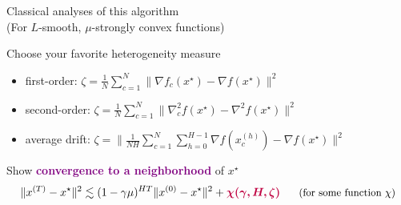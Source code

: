 \documentclass[aspectratio=169,12pt]{beamer}
\begin{document}
\begin{frame}{Classical analyses of this algorithm\\[-0.5em]
    \small (For $L$-smooth, $\mu$-strongly convex functions)}

  Choose your favorite heterogeneity measure
  \pause
  \begin{itemize}
  \item first-order: $\zeta = \frac{1}{N} \sum_{c=1}^N \big\| \nabla f_c(x^{\star}) - \nabla f(x^{\star}) \big\|^2$
  
  \pause
  
  \item second-order: $\zeta = \frac{1}{N} \sum_{c=1}^N \big\| \nabla_c^2 f(x^{\star}) - \nabla^2 f(x^{\star}) \big\|^2$
  
  \pause
  
  \item average drift: $\zeta = \big\| \frac{1}{NH} \sum_{c=1}^N \sum_{h=0}^{H-1} \nabla f(x_c^{(h)}) - \nabla f(x^{\star}) \big\|^2$
  \end{itemize}


  \pause

  Show \textcolor{purple}{\bfseries convergence to a neighborhood} of $x^\star$
  \begin{align*}
    \| x^{(T)} - x^\star \|^2 \lesssim (1 - \gamma \mu)^{HT} \| x^{(0)} - x^\star \|^2
    + \textcolor{purple}{\boldsymbol{\chi(\gamma, H, \zeta)}} ~~~~~\text{\small (for some function $\chi$)}
  \end{align*}

  \vspace{1em}

  
\end{frame}
\end{document}
